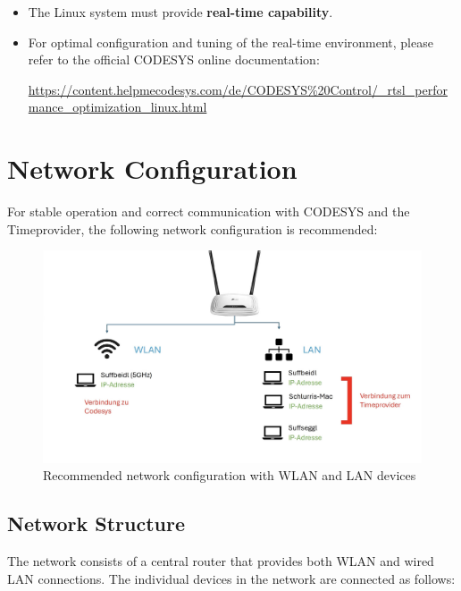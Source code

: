 \documentclass[a4paper,12pt]{article}
\begin{document}
\begin{itemize}
	\item The Linux system must provide \textbf{real-time capability}.
	\item For optimal configuration and tuning of the real-time environment, please refer to the official CODESYS online documentation:
	
	\url{https://content.helpmecodesys.com/de/CODESYS%20Control/_rtsl_performance_optimization_linux.html}
\end{itemize}

\newpage
\section{Network Configuration}

For stable operation and correct communication with CODESYS and the Timeprovider, the following network configuration is recommended:

\begin{figure}[H]
	\centering
	\includegraphics[width=1\textwidth]{2.jpg}
	\caption{Recommended network configuration with WLAN and LAN devices}
\end{figure}

\subsection*{Network Structure}

The network consists of a central router that provides both WLAN and wired LAN connections. The individual devices in the network are connected as follows:
\end{document}
